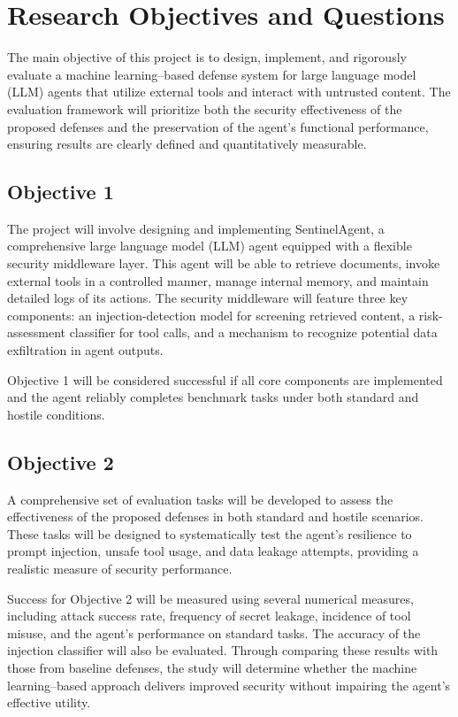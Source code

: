 \documentclass[11pt]{article}
\begin{document}
\section{Research Objectives and Questions}
The main objective of this project is to design, implement, and rigorously evaluate a machine learning--based defense system for large language model (LLM) agents that utilize external tools and interact with untrusted content. The evaluation framework will prioritize both the security effectiveness of the proposed defenses and the preservation of the agent's functional performance, ensuring results are clearly defined and quantitatively measurable.
\subsection*{Objective 1}
The project will involve designing and implementing SentinelAgent, a comprehensive large language model (LLM) agent equipped with a flexible security middleware layer. This agent will be able to retrieve documents, invoke external tools in a controlled manner, manage internal memory, and maintain detailed logs of its actions. The security middleware will feature three key components: an injection-detection model for screening retrieved content, a risk-assessment classifier for tool calls, and a mechanism to recognize potential data exfiltration in agent outputs. 

Objective 1 will be considered successful if all core components are implemented and the agent reliably completes benchmark tasks under both standard and hostile conditions.
\subsection*{Objective 2}
A comprehensive set of evaluation tasks will be developed to assess the effectiveness of the proposed defenses in both standard and hostile scenarios. These tasks will be designed to systematically test the agent's resilience to prompt injection, unsafe tool usage, and data leakage attempts, providing a realistic measure of security performance.

Success for Objective 2 will be measured using several numerical measures, including attack success rate, frequency of secret leakage, incidence of tool misuse, and the agent's performance on standard tasks. The accuracy of the injection classifier will also be evaluated. Through comparing these results with those from baseline defenses, the study will determine whether the machine learning--based approach delivers improved security without impairing the agent's effective utility.
\end{document}
